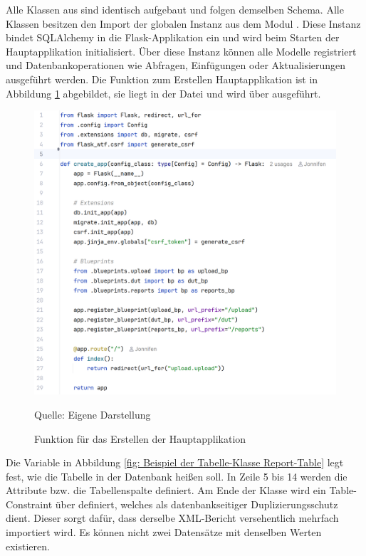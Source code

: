 Alle Klassen aus  sind identisch aufgebaut und folgen demselben Schema.
Alle Klassen besitzen den Import der globalen Instanz  aus dem Modul .
Diese Instanz bindet SQLAlchemy in die Flask-Applikation ein und wird beim Starten der Hauptapplikation initialisiert.
Über diese Instanz  können alle Modelle registriert und Datenbankoperationen wie Abfragen, Einfügungen oder Aktualisierungen ausgeführt werden.
Die Funktion zum Erstellen Hauptapplikation ist in Abbildung \ref{fig: Funktion für das Erstellen der Hauptapplikation} abgebildet, sie liegt in der Datei  und wird über  ausgeführt.

\begin{figure}[H]
    \centering
    \includegraphics[width=1\textwidth]{Grafiken/createapp.png}
    \caption{Funktion für das Erstellen der Hauptapplikation}
    \label{fig: Funktion für das Erstellen der Hauptapplikation}
    {Quelle: Eigene Darstellung}
\end{figure}


Die Variable  in Abbildung \ref{fig: Beispiel der Tabelle-Klasse Report-Table} legt fest, wie die Tabelle in der Datenbank heißen soll.
In Zeile 5 bis 14 werden die Attribute bzw. die Tabellenspalte definiert.
Am Ende der Klasse wird ein Table-Constraint über  definiert, welches als datenbankseitiger Duplizierungsschutz dient.
Dieser sorgt dafür, dass derselbe XML-Bericht versehentlich mehrfach importiert wird.
Es können nicht zwei Datensätze mit denselben Werten existieren.

